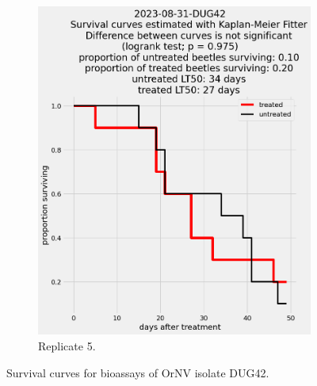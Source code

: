 \documentclass[12pt,letterpaper,english,bibliography=totocnumbered, abstract=on]{scrartcl}
\begin{document}
\begin{figure}[h]
\begin{subfigure}{.3\textwidth}
		\includegraphics[width=\textwidth]{images/survival_curves/2023-08-31-DUG42}
		\caption{Replicate 5.}
	\end{subfigure}
	\caption{Survival curves for bioassays of OrNV isolate DUG42.}
	\label{fig:DUG42 survival curves}
\end{figure}

\end{document}
